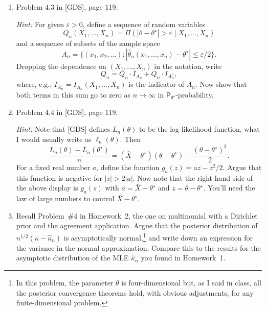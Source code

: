 \documentclass[a4paper,12pt]{article}
\newcommand{\prob}{\mathsf{P}}
\newcommand{\eps}{\varepsilon}
\newcommand{\Xbar}{\bar X}%
\begin{document}
\begin{enumerate}
\item Problem 4.3 in [GDS], page 119.

\emph{Hint:} For given $\eps > 0$, define a sequence of random variables 
\[ Q_n(X_1,\ldots,X_n) = \Pi(|\theta-\theta^\star| > \eps \mid X_1,\ldots,X_n) \]
and a sequence of subsets of the sample space 
\[ A_n = \{(x_1,x_2,\ldots): |\hat\theta_n(x_1,\ldots,x_n)-\theta^\star| \leq \eps/2\}. \]
Dropping the dependence on $(X_1,\ldots,X_n)$ in the notation, write 
\[ Q_n = Q_n \cdot I_{A_n} + Q_n \cdot I_{A_n^c}, \]
where, e.g., $I_{A_n} = I_{A_n}(X_1,\ldots,X_n)$ is the indicator of $A_n$.  Now show that both terms in this sum go to zero as $n \to \infty$ in $\prob_{\theta^\star}$-probability.  

\item Problem 4.4 in [GDS], page 119.

\emph{Hint:} Note that [GDS] defines $L_n(\theta)$ to be the log-likelihood function, what I would usually write as $\ell_n(\theta)$.  Then 
\[ \frac{L_n(\theta) - L_n(\theta^\star)}{n} = (\Xbar-\theta^\star) (\theta-\theta^\star) - \frac{(\theta-\theta^\star)^2}{2}. \]
For a fixed real number $a$, define the function $g_a(z)=az-z^2/2$.  Argue that this function is negative for $|z| > 2|a|$.  Now note that the right-hand side of the above display is $g_a(z)$ with $a=\Xbar-\theta^\star$ and $z=\theta-\theta^\star$.  You'll need the law of large numbers to control $\Xbar-\theta^\star$.  

\item Recall Problem~\#4 in Homework~2, the one on multinomial with a Dirichlet prior and the agreement application.  Argue that the posterior distribution of $n^{1/2}(\kappa-\hat\kappa_n)$ is asymptotically normal,\footnote{In this problem, the parameter $\theta$ is four-dimensional but, as I said in class, all the posterior convergence theorems hold, with obvious adjustments, for any finite-dimensional problem.} and write down an expression for the variance in the normal approximation.  Compare this to the results for the asymptotic distribution of the MLE $\hat\kappa_n$ you found in Homework~1.   

\end{enumerate}
\end{document}

